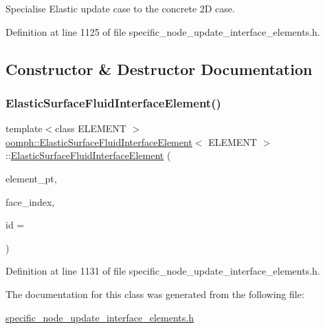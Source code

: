 Specialise Elastic update case to the concrete 2D case. 

Definition at line 1125 of file specific\+\_\+node\+\_\+update\+\_\+interface\+\_\+elements.\+h.



\subsection{Constructor \& Destructor Documentation}
\mbox{\label{classoomph_1_1ElasticSurfaceFluidInterfaceElement_aa2add34e23b16990c7000d699bc395e2}} 
\subsubsection{\texorpdfstring{Elastic\+Surface\+Fluid\+Interface\+Element()}{ElasticSurfaceFluidInterfaceElement()}}
{\footnotesize\ttfamily template$<$class E\+L\+E\+M\+E\+NT $>$ \\
\hyperlink{classoomph_1_1ElasticSurfaceFluidInterfaceElement}{oomph\+::\+Elastic\+Surface\+Fluid\+Interface\+Element}$<$ E\+L\+E\+M\+E\+NT $>$\+::\hyperlink{classoomph_1_1ElasticSurfaceFluidInterfaceElement}{Elastic\+Surface\+Fluid\+Interface\+Element} (\begin{DoxyParamCaption}\item[{Finite\+Element $\ast$const \&}]{element\+\_\+pt,  }\item[{const int \&}]{face\+\_\+index,  }\item[{const unsigned \&}]{id = {} }\end{DoxyParamCaption})\hspace{0.3cm}{\ttfamily [inline]}}



Definition at line 1131 of file specific\+\_\+node\+\_\+update\+\_\+interface\+\_\+elements.\+h.



The documentation for this class was generated from the following file\+:\begin{DoxyCompactItemize}
\item 
\hyperlink{specific__node__update__interface__elements_8h}{specific\+\_\+node\+\_\+update\+\_\+interface\+\_\+elements.\+h}\end{DoxyCompactItemize}
